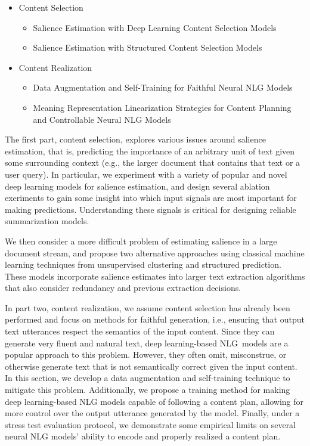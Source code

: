 \begin{itemize}
  \item Content Selection
  \begin{itemize}
    \item Salience Estimation with Deep Learning Content Selection Models
    \item Salience Estimation with Structured Content Selection Models
  \end{itemize}
  \item Content Realization
  \begin{itemize}
    \item Data Augmentation and Self-Training for Faithful Neural NLG Models
    \item Meaning Representation Linearization Strategies for Content Planning
          and Controllable Neural NLG Models
  \end{itemize}
\end{itemize}

The first part, content selection, explores various issues around salience
estimation, that is, predicting the importance of an arbitrary unit of text
given some surrounding context (e.g., the larger document that contains that
text or a user query). In particular, we experiment with a variety of popular
and novel deep learning models for salience estimation, and design several
ablation exeriments to gain some insight into which input signals are most
important for making predictions. Understanding these signals is critical for
designing reliable summarization models. 

We then consider a more difficult problem of estimating salience in a large
document stream, and propose two alternative approaches using classical
machine learning techniques from unsupervised clustering and structured
prediction. These models incorporate salience estimates into larger text
extraction algorithms that also consider redundancy and previous extraction
decisions.
    
In part two, content realization, we assume content selection has already been
performed and focus on methods for faithful generation, i.e., ensuring that
output text utterances respect the semantics of the input content. Since they
can generate very fluent and natural text, deep learning-based NLG~models are
a popular approach to this problem. However, they often omit, misconstrue, or
otherwise generate text that is not semantically correct given the input
content. In this section, we develop a data augmentation and self-training
technique to mitigate this problem. Additionally, we propose a training method
for making deep learning-based NLG models capable of following a content plan,
allowing for more control over the output utterance generated by the model.
Finally, under a stress test evaluation protocol, we demonstrate some
empirical limits on several neural NLG models' ability to encode and properly
realized a content plan.
 
